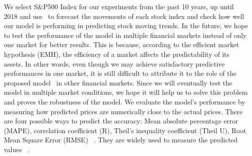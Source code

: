 We select S\&P500 Index for our experiments from the past 10 years, up until 2018 and use \scheme\ to forecast the movements of each stock index and check how well our model is performing in predicting stock moving trends. In the future, we hope to test the performance of the model in multiple financial markets instead of only one market for better results. This is because, according to the efficient market hypothesis (EMH), the efficiency of a market affects the predictability of its assets. In other words, even though we may achieve satisfactory predictive performances in one market, it is still difficult to attribute it to the role of the proposed model~\cite{bao2017deep} in other financial markets. Since we will eventually test the model in multiple market conditions, we hope it will help us to solve this problem and proves the robustness of the model. We evaluate the model's performance by measuring how predicted prices are numerically close to the actual prices. There are four possible ways to predict the accuracy: Mean absolute percentage error (MAPE), correlation coefficient (R), Theil's inequality coefficient (Theil U), Root Mean Square Error (RMSE) ~\cite{bao2017deep}. They are widely used to measure the predicted values ~\cite{hsieh2011forecasting}.

 
 
 
 
 
 
 






